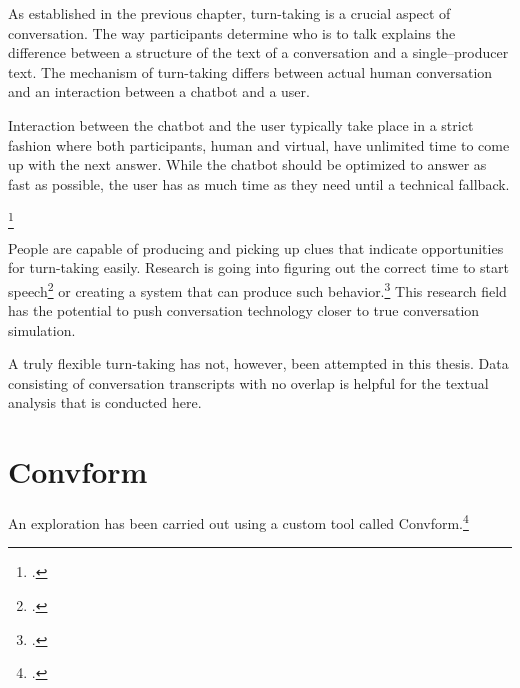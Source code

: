 \documentclass[12pt]{report}
\begin{document}
{\par
As established in the previous chapter, turn-taking is a crucial aspect of conversation.
The way participants determine who is to talk
explains the difference between
a structure of the text of a conversation
and a single–producer text.
The mechanism of turn-taking differs
between actual human conversation
and an interaction between a chatbot and a user.

Interaction between the chatbot and the user
typically take place in a strict fashion
where both participants,
human and virtual,
have unlimited time to come up with the next answer.
While the chatbot should be optimized to answer as fast as possible,
the user has as much time as they need until a technical fallback.

\par
{}\footcite{turntaking}

\par
People are capable of producing and picking up clues
that indicate opportunities for turn-taking easily.
Research is going
into figuring out the correct time to start speech\footcite{turntakingreview,GRAVANO2011601}
or creating a system that can produce such behavior.\footcite{distributedturntaking,Gervits2020Sigdial}
This research field
has the potential to push conversation technology
closer to true conversation simulation.

\par
A truly flexible turn-taking has not, however, been attempted in this thesis.
Data consisting of conversation transcripts with no overlap
is helpful for the textual analysis that is conducted here.

\section{Convform}
\par
An exploration has been carried out using a custom tool called Convform.\footcite{convform}

}
\end{document}
